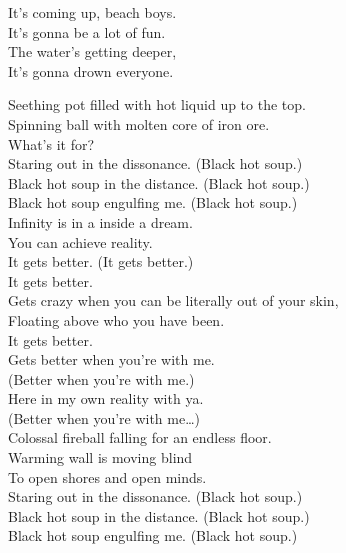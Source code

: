 It's coming up, beach boys. \\
It's gonna be a lot of fun. \\
The water's getting deeper, \\
It's gonna drown everyone. \\





Seething pot filled with hot liquid up to the top. \\
Spinning ball with molten core of iron ore. \\
What's it for? \\

Staring out in the dissonance. (Black hot soup.) \\
Black hot soup in the distance. (Black hot soup.) \\
Black hot soup engulfing me. (Black hot soup.) \\

Infinity is in a  inside a dream. \\
You can achieve reality. \\
It gets better. (It gets better.) \\
It gets better. \\

Gets crazy when you can be literally out of your skin, \\
Floating above who you have been. \\
It gets better. \\
Gets better when you're with me. \\
(Better when you're with me.) \\
Here in my own reality with ya. \\
(Better when you're with me…) \\

Colossal fireball falling for an endless floor. \\
Warming wall is moving blind \\
To open shores and open minds. \\

Staring out in the dissonance. (Black hot soup.) \\
Black hot soup in the distance. (Black hot soup.) \\
Black hot soup engulfing me. (Black hot soup.) \\

